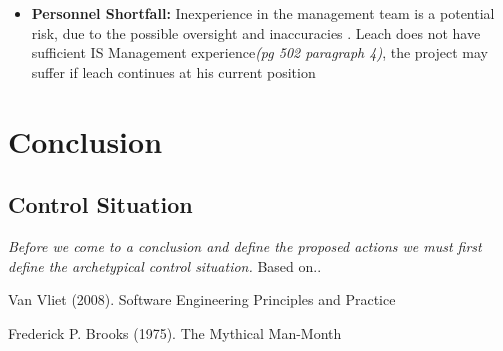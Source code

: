 \documentclass[12pt]{article} %
\begin{document}
	
	
	\begin{itemize} 
		\item \textbf{Personnel Shortfall:} Inexperience in the management team is a potential risk, due to the possible oversight and inaccuracies . Leach does not have sufficient IS Management experience\textit{(pg 502 paragraph 4)}, the project may suffer if leach continues
		at his current position 
		
	\end{itemize}
	
	\section{Conclusion} %
	
	\subsection {Control Situation}
	
	\textit{Before we come to a conclusion and define the proposed actions we must first define the archetypical control situation. } Based on.. \\ %
	
	
	\newpage
	
	
	\begin{thebibliography}{99} %
		
		Van Vliet (2008).
		\newblock Software Engineering Principles and Practice
		
		Frederick P. Brooks (1975).
		\newblock The Mythical Man-Month
		
	\end{thebibliography}
	
	
\end{document}
